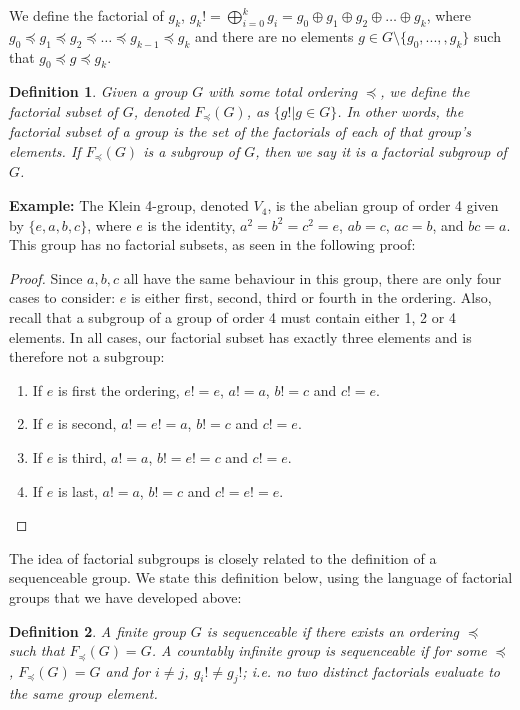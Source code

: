 \documentclass{article}
\newtheorem{definition}{Definition}
\begin{document}
We define the factorial of $g_k$, $g_k! = \bigoplus_{i=0}^{k} g_i = g_0 \oplus g_1 \oplus g_2 \oplus \ldots \oplus g_k$, where $g_0\preceq g_1\preceq g_2 \preceq \ldots \preceq g_{k-1} \preceq g_k$ and there are no elements $g\in G\setminus\{g_0,...,,g_k\}$ such that $g_0\preceq g\preceq g_k$.
\begin{definition}
Given a group $G$ with some total ordering $\preceq$, we define the \textit{factorial subset} of $G$, denoted $F_\preceq(G)$, as $\{g! | g \in G\}$. In other words, the factorial subset of a group is the set of the factorials of each of that group's elements. If $F_\preceq(G)$ is a subgroup of $G$, then we say it is a \textit{factorial subgroup} of $G$. 
\end{definition}

\textbf{Example:} The Klein 4-group, denoted $V_4$, is the abelian group of order 4 given by $\{e,a,b,c\}$, where $e$ is the identity, $a^2 = b^2 = c^2 = e$, $ab = c$, $ac = b$, and $bc = a$. This group has no factorial subsets, as seen in the following proof:


\begin{proof} Since $a,b,c$ all have the same behaviour in this group, there are only four cases to consider: $e$ is either first, second, third or fourth in the ordering. Also, recall that a subgroup of a group of order 4 must contain either 1, 2 or 4 elements. In all cases, our factorial subset has exactly three elements and is therefore not a subgroup:
\begin{enumerate}
    \item If $e$ is first the ordering, $e!=e$, $a!=a$, $b!=c$ and $c!=e$.  
    \item If $e$ is second, $a!=e!=a$, $b!=c$ and $c!=e$.
    \item If $e$ is third, $a!=a$, $b!=e!=c$ and $c!=e$. 
    \item If $e$ is last, $a!=a$, $b!=c$ and $c!=e!=e$.
\end{enumerate}
\end{proof}


The idea of factorial subgroups is closely related to the definition of a sequenceable group. We state this definition below, using the language of factorial groups that we have developed above:

\begin{definition} A finite group $G$ is \textit{sequenceable} if there exists an ordering $\preceq$ such that $F_\preceq(G) = G$. A countably infinite group is sequenceable if for some $\preceq$, $F_\preceq(G) = G$ and for $i\neq j$, $g_i!\neq g_j!$; i.e. no two distinct factorials evaluate to the same group element.
\end{definition}
\end{document}
